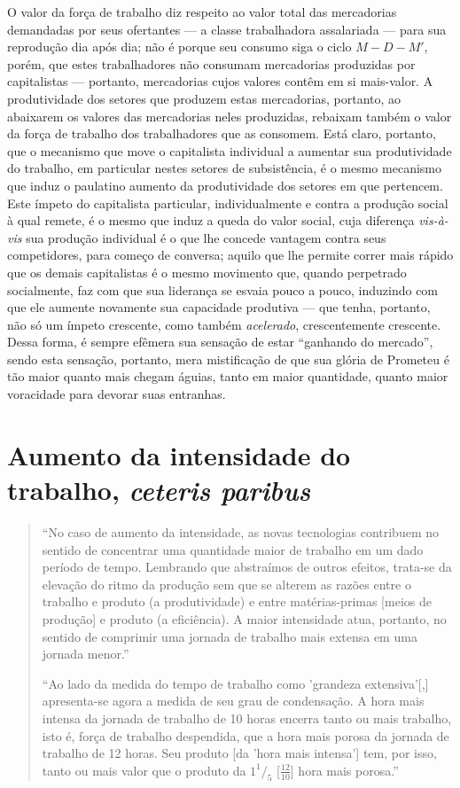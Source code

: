 \documentclass[12pt]{article}
\numberwithin{equation}{section}
\theoremstyle{plain}
\theoremstyle{definition}
\theoremstyle{remark}
\begin{document}
O valor da força de trabalho diz respeito ao valor total das mercadorias demandadas por seus ofertantes — a classe trabalhadora assalariada — para sua reprodução dia após dia; não é porque seu consumo siga o ciclo $M-D-M'$, porém, que estes trabalhadores não consumam mercadorias produzidas por capitalistas — portanto, mercadorias cujos valores contêm em si mais-valor. A produtividade dos setores que produzem estas mercadorias, portanto, ao abaixarem os valores das mercadorias neles produzidas, rebaixam também o valor da força de trabalho dos trabalhadores que as consomem. Está claro, portanto, que o mecanismo que move o capitalista individual a aumentar sua produtividade do trabalho, em particular nestes setores de subsistência, é o mesmo mecanismo que induz o paulatino aumento da produtividade dos setores em que pertencem. Este ímpeto do capitalista particular, individualmente e contra a produção social à qual remete, é o mesmo que induz a queda do valor social, cuja diferença \textit{vis-à-vis} sua produção individual é o que lhe concede vantagem contra seus competidores, para começo de conversa; aquilo que lhe permite correr mais rápido que os demais capitalistas é o mesmo movimento que, quando perpetrado socialmente, faz com que sua liderança se esvaia pouco a pouco, induzindo com que ele aumente novamente sua capacidade produtiva — que tenha, portanto, não só um ímpeto crescente, como também \textit{acelerado}, crescentemente crescente. Dessa forma, é sempre efêmera sua sensação de estar ``ganhando do mercado'', sendo esta sensação, portanto, mera mistificação de que sua glória de Prometeu é tão maior quanto mais chegam águias, tanto em maior quantidade, quanto maior voracidade para devorar suas entranhas. 

\section{Aumento da intensidade do trabalho, \textit{ceteris paribus}}
\begin{quote}
``No caso de aumento da intensidade, as novas tecnologias contribuem no sentido de concentrar uma quantidade maior de trabalho em um dado período de tempo. Lembrando que abstraímos de outros efeitos, trata-se da elevação do ritmo da produção sem que se alterem as razões entre o trabalho e produto (a produtividade) e entre matérias-primas [meios de produção] e produto (a eficiência). A maior intensidade atua, portanto, no sentido de comprimir uma jornada de trabalho mais extensa em uma jornada menor.'' \parencite[p. 234]{SaBarreto2021a}

``Ao lado da medida do tempo de trabalho como 'grandeza extensiva'[,] apresenta-se agora a medida de seu grau de condensação. A hora mais intensa da jornada de trabalho de 10 horas encerra tanto ou mais trabalho, isto é, força de trabalho despendida, que a hora mais porosa da jornada de trabalho de 12 horas. Seu produto [da 'hora mais intensa'] tem, por isso, tanto ou mais valor que o produto da $1 ^1/_{5}$ [$\frac{12}{10}$] hora mais porosa.'' \parencite[p. 482-3]{Marx2017}
\end{quote}
\end{document}
